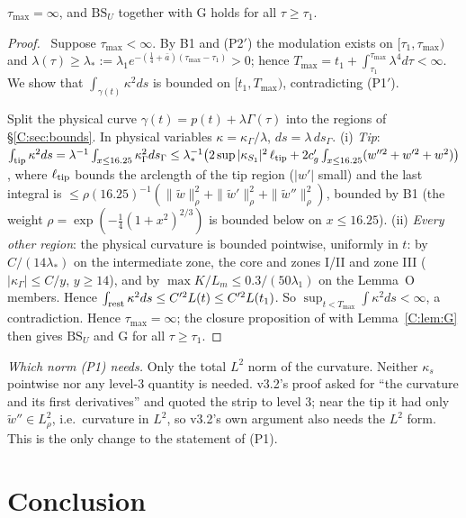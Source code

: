 \documentclass[11pt]{article}
\begin{document}
\begin{proposition}\label{C:prop:global}
$\tau_{\max}=\infty$, and $\mathrm{BS}_U$ together with $\mathrm{G}$ holds for all $\tau\ge\tau_1$.
\end{proposition}
\begin{proof}\tP\ Suppose $\tau_{\max}<\infty$. By B1 and (P2$'$) the modulation exists on $[\tau_1,\tau_{\max})$ and $\lambda(\tau)\ge\lambda_*:=\lambda_1e^{-(\frac14+\bar a)(\tau_{\max}-\tau_1)}>0$; hence $T_{\max}=t_1+\int_{\tau_1}^{\tau_{\max}}\lambda^4d\tau<\infty$. We show that $\int_{\gamma(t)}\kappa^2ds$ is bounded on $[t_1,T_{\max})$, contradicting (P1$'$).

Split the physical curve $\gamma(t)=p(t)+\lambda\Gamma(\tau)$ into the regions of \S\ref{C:sec:bounds}. In physical variables $\kappa=\kappa_\Gamma/\lambda$, $ds=\lambda\,ds_\Gamma$.
(i) \emph{Tip}: $\int_{\rm tip}\kappa^2ds=\lambda^{-1}\int_{x\le16.25}\kappa_\Gamma^2ds_\Gamma\le\lambda_*^{-1}\bigl(2\sup|\kappa_{S_1}|^2\,\ell_{\rm tip}+2c_g'\int_{x\le16.25}(w''^2+w'^2+w^2)\bigr)$, where $\ell_{\rm tip}$ bounds the arclength of the tip region ($|w'|$ small) and the last integral is $\le\rho(16.25)^{-1}(\|\tilde w\|_\rho^2+\|\tilde w'\|_\rho^2+\|\tilde w''\|_\rho^2)$, bounded by B1 (the weight $\rho=\exp(-\frac14(1+x^2)^{2/3})$ is bounded below on $x\le16.25$).
(ii) \emph{Every other region}: the physical curvature is bounded pointwise, uniformly in $t$: by $C/(14\lambda_*)$ on the intermediate zone, the core and zones I/II and zone III ($|\kappa_\Gamma|\le C/y$, $y\ge14$), and by $\max K/L_m\le0.3/(50\lambda_1)$ on the Lemma~O members. Hence $\int_{\rm rest}\kappa^2ds\le C'^2L(t)\le C'^2L(t_1)$.
So $\sup_{t<T_{\max}}\int\kappa^2ds<\infty$, a contradiction. Hence $\tau_{\max}=\infty$; the closure proposition of  with Lemma~\ref{C:lem:G} then gives $\mathrm{BS}_U$ and G for all $\tau\ge\tau_1$.
\end{proof}
\noindent\emph{Which norm (P1) needs.} Only the total $L^2$ norm of the curvature. Neither $\kappa_s$ pointwise nor any level-3 quantity is needed. v3.2's proof asked for ``the curvature and its first derivatives'' and quoted the strip to level 3; near the tip it had only $\tilde w''\in L^2_\rho$, i.e.\ curvature in $L^2$, so v3.2's own argument also needs the $L^2$ form. This is the only change to the statement of (P1).

\section{Conclusion}\label{C:sec:concl}
\end{document}
